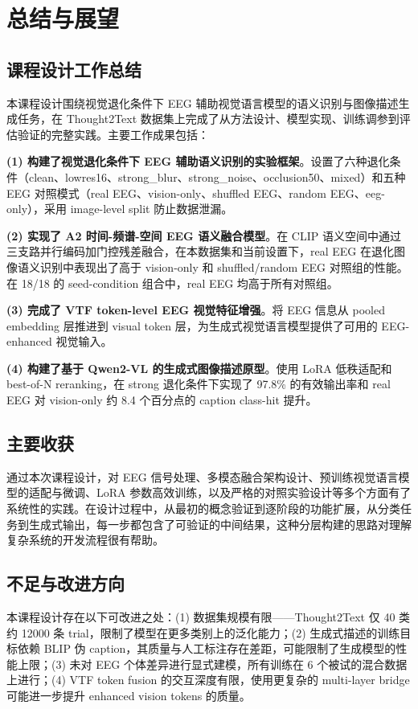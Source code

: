 \section{总结与展望}

\subsection{课程设计工作总结}

本课程设计围绕视觉退化条件下 EEG 辅助视觉语言模型的语义识别与图像描述生成任务，在 Thought2Text 数据集上完成了从方法设计、模型实现、训练调参到评估验证的完整实践。主要工作成果包括：

\textbf{(1) 构建了视觉退化条件下 EEG 辅助语义识别的实验框架}。设置了六种退化条件（clean、lowres16、strong\_blur、strong\_noise、occlusion50、mixed）和五种 EEG 对照模式（real EEG、vision-only、shuffled EEG、random EEG、eeg-only），采用 image-level split 防止数据泄漏。

\textbf{(2) 实现了 A2 时间-频谱-空间 EEG 语义融合模型}。在 CLIP 语义空间中通过三支路并行编码加门控残差融合，在本数据集和当前设置下，real EEG 在退化图像语义识别中表现出了高于 vision-only 和 shuffled/random EEG 对照组的性能。在 18/18 的 seed-condition 组合中，real EEG 均高于所有对照组。

\textbf{(3) 完成了 VTF token-level EEG 视觉特征增强}。将 EEG 信息从 pooled embedding 层推进到 visual token 层，为生成式视觉语言模型提供了可用的 EEG-enhanced 视觉输入。

\textbf{(4) 构建了基于 Qwen2-VL 的生成式图像描述原型}。使用 LoRA 低秩适配和 best-of-N reranking，在 strong 退化条件下实现了 97.8\% 的有效输出率和 real EEG 对 vision-only 约 8.4 个百分点的 caption class-hit 提升。

\subsection{主要收获}

通过本次课程设计，对 EEG 信号处理、多模态融合架构设计、预训练视觉语言模型的适配与微调、LoRA 参数高效训练，以及严格的对照实验设计等多个方面有了系统性的实践。在设计过程中，从最初的概念验证到逐阶段的功能扩展，从分类任务到生成式输出，每一步都包含了可验证的中间结果，这种分层构建的思路对理解复杂系统的开发流程很有帮助。

\subsection{不足与改进方向}

本课程设计存在以下可改进之处：(1) 数据集规模有限——Thought2Text 仅 40 类约 12000 条 trial，限制了模型在更多类别上的泛化能力；(2) 生成式描述的训练目标依赖 BLIP 伪 caption，其质量与人工标注存在差距，可能限制了生成模型的性能上限；(3) 未对 EEG 个体差异进行显式建模，所有训练在 6 个被试的混合数据上进行；(4) VTF token fusion 的交互深度有限，使用更复杂的 multi-layer bridge 可能进一步提升 enhanced vision tokens 的质量。

